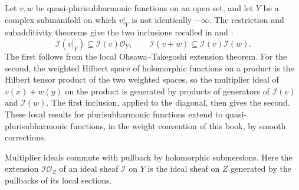 Let $v,w$ be quasi-plurisubharmonic functions on an open set, and let $Y$ be a complex submanifold on which $v|_Y$ is not identically $-\infty$. The restriction and subadditivity theorems give the two inclusions recalled in \cite{SGPT} and \cite[Section~15]{DemAM11}:
\begin{equation}\label{eq:trace-local-ideal-inputs}
 \mathcal I(v|_Y)\subseteq\mathcal I(v)\mathcal O_Y,
 \qquad
 \mathcal I(v+w)\subseteq\mathcal I(v)\mathcal I(w).
\end{equation}
The first follows from the local Ohsawa--Takegoshi extension theorem. For the second, the weighted Hilbert space of holomorphic functions on a product is the Hilbert tensor product of the two weighted spaces, so the multiplier ideal of $v(x)+w(y)$ on the product is generated by products of generators of $\mathcal I(v)$ and $\mathcal I(w)$. The first inclusion, applied to the diagonal, then gives the second. These local results for plurisubharmonic functions extend to quasi-plurisubharmonic functions, in the weight convention of this book, by smooth corrections.

Multiplier ideals commute with pullback by holomorphic submersions. Here the extension $\mathcal I\mathcal O_Z$ of an ideal sheaf $\mathcal I$ on $Y$ is the ideal sheaf on $Z$ generated by the pullbacks of its local sections.

